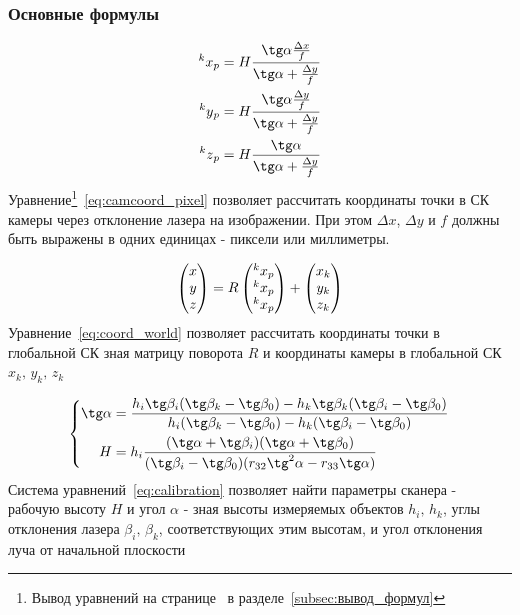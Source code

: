 \documentclass[a4paper, 12pt]{article}
\begin{document}
    \subsubsection{Основные формулы}
    \begin{equation}
        \label{eq:camcoord_pixel}
        \begin{aligned}
            \prescript{k}{}{x}_p = H\frac{\tg\alpha\frac{\Delta x}{f}}{\tg\alpha+\frac{\Delta y}{f}}\\
            \prescript{k}{}{y}_p = H\frac{\tg\alpha\frac{\Delta y}{f}}{\tg\alpha+\frac{\Delta y}{f}}\\
            \prescript{k}{}{z}_p = H\frac{\tg\alpha}{\tg\alpha+\frac{\Delta y}{f}}
        \end{aligned}
    \end{equation}
    Уравнение\footnote{Вывод уравнений на странице~\pageref{subsec:вывод_формул} в разделе~\ref{subsec:вывод_формул}}~\eqref{eq:camcoord_pixel} позволяет рассчитать координаты точки в СК камеры через отклонение лазера на изображении.
    При этом $\Delta x$, $\Delta y$ и $f$ должны быть выражены в одних единицах - пиксели или миллиметры.

    \begin{equation}
        \label{eq:coord_world}
        \begin{pmatrix}
            x\\y\\z
        \end{pmatrix}
        =
        R
        \begin{pmatrix}
            \prescript{k}{}{x}_p\\
            \prescript{k}{}{x}_p\\
            \prescript{k}{}{x}_p
        \end{pmatrix}
        +
        \begin{pmatrix}
            x_k\\y_k\\z_k
        \end{pmatrix}
    \end{equation}
    Уравнение~\eqref{eq:coord_world} позволяет рассчитать координаты точки в глобальной СК зная матрицу поворота $R$ и координаты камеры в глобальной СК $x_k,\,y_k,\,z_k$

    \begin{equation}
        \label{eq:calibration}
        \left\{
        \begin{aligned}
            \tg\alpha &= \frac{h_i\tg\beta_i(\tg\beta_k-\tg\beta_0) - h_k\tg\beta_k(\tg\beta_i-\tg\beta_0)}{h_i(\tg\beta_k-\tg\beta_0) - h_k(\tg\beta_i-\tg\beta_0)}\\
            H &= h_i\frac{(\tg\alpha + \tg\beta_i)(\tg\alpha + \tg\beta_0)}{(\tg\beta_i - \tg\beta_0)(r_{32}\tg^2\alpha-r_{33}\tg\alpha)}
        \end{aligned}
        \right.
    \end{equation}
    Система уравнений~\eqref{eq:calibration} позволяет найти параметры сканера - рабочую высоту $H$ и угол $\alpha$ - зная высоты измеряемых объектов $h_i,\,h_k$, углы отклонения лазера $\beta_i,\,\beta_k$, соответствующих этим высотам, и угол отклонения луча от начальной плоскости
\end{document}

